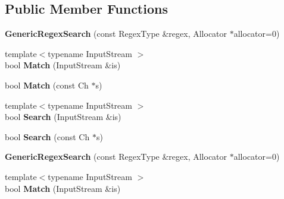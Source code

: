 \subsection*{Public Member Functions}
\begin{DoxyCompactItemize}
\item 
{\bfseries Generic\+Regex\+Search} (const Regex\+Type \&regex, Allocator $\ast$allocator=0)\hypertarget{classinternal_1_1_generic_regex_search_a72f70e210a4bc944dba62655a008750b}{}\label{classinternal_1_1_generic_regex_search_a72f70e210a4bc944dba62655a008750b}

\item 
{\footnotesize template$<$typename Input\+Stream $>$ }\\bool {\bfseries Match} (Input\+Stream \&is)\hypertarget{classinternal_1_1_generic_regex_search_ad204164a20e3ac403b405683b51c2d0b}{}\label{classinternal_1_1_generic_regex_search_ad204164a20e3ac403b405683b51c2d0b}

\item 
bool {\bfseries Match} (const Ch $\ast$s)\hypertarget{classinternal_1_1_generic_regex_search_a9d3fe83905549d2fd4c513b8eacd14de}{}\label{classinternal_1_1_generic_regex_search_a9d3fe83905549d2fd4c513b8eacd14de}

\item 
{\footnotesize template$<$typename Input\+Stream $>$ }\\bool {\bfseries Search} (Input\+Stream \&is)\hypertarget{classinternal_1_1_generic_regex_search_a766c684321471b468ff468648f186cf0}{}\label{classinternal_1_1_generic_regex_search_a766c684321471b468ff468648f186cf0}

\item 
bool {\bfseries Search} (const Ch $\ast$s)\hypertarget{classinternal_1_1_generic_regex_search_a97398161c60f3ed3e4aabaff952c6f1e}{}\label{classinternal_1_1_generic_regex_search_a97398161c60f3ed3e4aabaff952c6f1e}

\item 
{\bfseries Generic\+Regex\+Search} (const Regex\+Type \&regex, Allocator $\ast$allocator=0)\hypertarget{classinternal_1_1_generic_regex_search_a72f70e210a4bc944dba62655a008750b}{}\label{classinternal_1_1_generic_regex_search_a72f70e210a4bc944dba62655a008750b}

\item 
{\footnotesize template$<$typename Input\+Stream $>$ }\\bool {\bfseries Match} (Input\+Stream \&is)\hypertarget{classinternal_1_1_generic_regex_search_ad204164a20e3ac403b405683b51c2d0b}{}\label{classinternal_1_1_generic_regex_search_ad204164a20e3ac403b405683b51c2d0b}


\end{DoxyCompactItemize}
